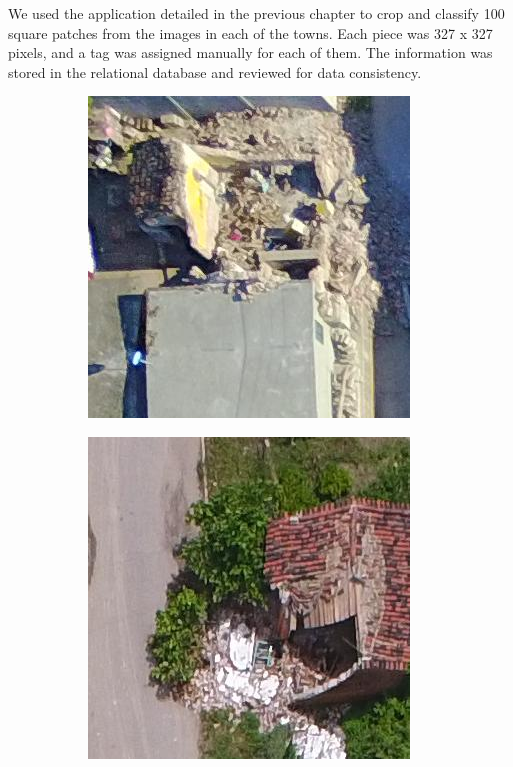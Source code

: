 We used the application detailed in the previous chapter to crop and classify 100 square patches from the images in each of the towns. Each piece was 327 x 327 pixels, and a tag was assigned manually for each of them. The information was stored in the relational database and reviewed for data consistency.\\

\begin{figure}[!ht]
  \centering
    \begin{subfigure}{.24\textwidth}
        \includegraphics[width=\textwidth]{images/damaged1.jpg}
    \end{subfigure}
    \begin{subfigure}{.24\textwidth}
        \includegraphics[width=\textwidth]{images/damaged2.jpg}

\end{subfigure}
\end{figure}
